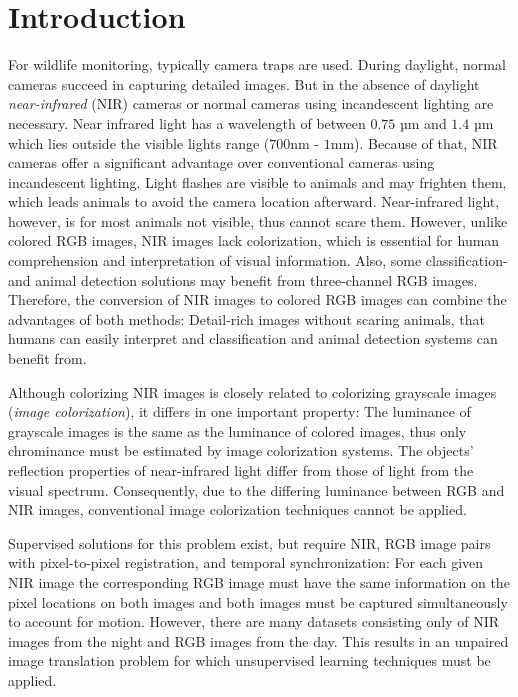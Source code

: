 \chapter{Introduction}
For wildlife monitoring, typically camera traps are used. During daylight, normal cameras succeed in capturing detailed images.
But in the absence of daylight \textit{near-infrared} (NIR) cameras or normal cameras using incandescent lighting are necessary.
Near infrared light has a wavelength of between $0.75$ µm and $1.4$ µm which lies outside the visible lights range ($700$nm - $1$mm).  
Because of that, NIR cameras offer a significant advantage over conventional cameras using incandescent lighting.
Light flashes are visible to animals and may frighten them, which leads animals to avoid the camera location afterward.
Near-infrared light, however, is for most animals not visible, thus cannot scare them.
However, unlike colored RGB images, NIR images lack colorization, which is essential for human comprehension and interpretation of visual information.
Also, some classification- and animal detection solutions may benefit from three-channel RGB images.
Therefore, the conversion of NIR images to colored RGB images can combine the advantages of both methods:
Detail-rich images without scaring animals, that humans can easily interpret and classification and animal detection systems can benefit from.

Although colorizing NIR images is closely related to colorizing grayscale images (\textit{image colorization}), it differs in one important property:
The luminance of grayscale images is the same as the luminance of colored images, thus only chrominance must be estimated by image colorization systems.
The objects' reflection properties of near-infrared light differ from those of light from the visual spectrum.
Consequently, due to the differing luminance between RGB and NIR images, conventional image colorization techniques cannot be applied.

Supervised solutions for this problem exist, but require NIR, RGB image pairs with pixel-to-pixel registration, and temporal synchronization:
For each given NIR image the corresponding RGB image must have the same information on the pixel locations on both images and both images must be captured simultaneously to account for motion.
However, there are many datasets consisting only of NIR images from the night and RGB images from the day.
This results in an unpaired image translation problem for which unsupervised learning techniques must be applied.

